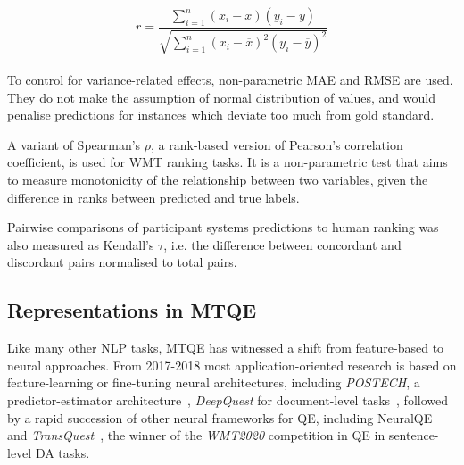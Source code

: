\begin{equation}\label{eq:pearson}
r = \frac{{}\sum_{i=1}^{n} (x_i - \overline{x})(y_i - \overline{y})}
{\sqrt{\sum_{i=1}^{n} (x_i - \overline{x})^2(y_i - \overline{y})^2}}
\end{equation}
\\
To control for variance-related effects, non-parametric \gls{MAE} and \gls{RMSE} are used. They do not make the assumption of normal distribution of values, and would penalise predictions for instances which deviate too much from gold standard. 

A variant of Spearman's $\rho$, a rank-based version of Pearson's correlation coefficient, is used for WMT ranking tasks. It is a non-parametric test that aims to measure monotonicity of the relationship between two variables, given the difference in ranks between predicted and true labels. %

Pairwise comparisons of participant systems predictions to human ranking was also measured as Kendall's $\tau$, i.e. the difference between concordant and discordant pairs normalised to total pairs.


\subsection{\label{ssec:mtqe}Representations in MTQE}
Like many other NLP tasks, MTQE has witnessed a shift from feature-based to neural approaches.
From 2017-2018 most application-oriented research is based on feature-learning or fine-tuning neural architectures, including \textit{POSTECH}, a predictor-estimator architecture~\cite{Kim2017a}, \textit{DeepQuest} for document-level tasks~\cite{Ive2018}, followed by a rapid succession of other neural frameworks for QE, including NeuralQE~\cite{Martins2017} and \textit{TransQuest}~\cite{Ranasinghe2020}, the winner of the \textit{WMT2020} competition in QE in sentence-level DA tasks.

